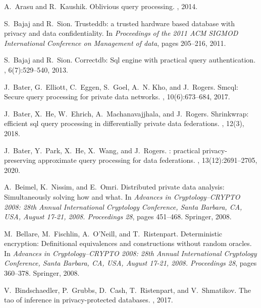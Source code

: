 \documentclass[11pt]{article}
\begin{document}
\begin{thebibliography}{140}
\begin{small}
A.~Arasu and R.~Kaushik.
\newblock Oblivious query processing.
, 2014.

S.~Bajaj and R.~Sion.
\newblock Trusteddb: a trusted hardware based database with privacy and data
  confidentiality.
\newblock In {\em Proceedings of the 2011 ACM SIGMOD International Conference
  on Management of data}, pages 205--216, 2011.

S.~Bajaj and R.~Sion.
\newblock Correctdb: Sql engine with practical query authentication.
, 6(7):529--540, 2013.

J.~Bater, G.~Elliott, C.~Eggen, S.~Goel, A.~N. Kho, and J.~Rogers.
\newblock Smcql: Secure query processing for private data networks.
, 10(6):673--684, 2017.

J.~Bater, X.~He, W.~Ehrich, A.~Machanavajjhala, and J.~Rogers.
\newblock Shrinkwrap: efficient sql query processing in differentially private
  data federations.
, 12(3), 2018.

J.~Bater, Y.~Park, X.~He, X.~Wang, and J.~Rogers.
: practical privacy-preserving approximate query processing for
  data federations.
, 13(12):2691--2705, 2020.

A.~Beimel, K.~Nissim, and E.~Omri.
\newblock Distributed private data analysis: Simultaneously solving how and
  what.
\newblock In {\em Advances in Cryptology--CRYPTO 2008: 28th Annual
  International Cryptology Conference, Santa Barbara, CA, USA, August 17-21,
  2008. Proceedings 28}, pages 451--468. Springer, 2008.

M.~Bellare, M.~Fischlin, A.~O’Neill, and T.~Ristenpart.
\newblock Deterministic encryption: Definitional equivalences and constructions
  without random oracles.
\newblock In {\em Advances in Cryptology--CRYPTO 2008: 28th Annual
  International Cryptology Conference, Santa Barbara, CA, USA, August 17-21,
  2008. Proceedings 28}, pages 360--378. Springer, 2008.

V.~Bindschaedler, P.~Grubbs, D.~Cash, T.~Ristenpart, and V.~Shmatikov.
\newblock The tao of inference in privacy-protected databases.
, 2017.


\end{small}
\end{thebibliography}
\end{document}

